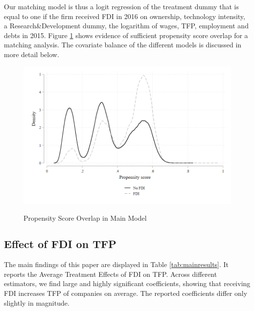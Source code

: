 \documentclass[a4paper,11pt]{scrartcl}
\begin{document}
Our matching model is thus a logit regression of the treatment dummy that is equal to one if the firm received FDI in 2016 on ownership, technology intensity, a Research\&Development dummy, the logarithm of wages, TFP, employment and debts in 2015. Figure \ref{fig:graph} shows evidence of sufficient propensity score overlap for a matching analysis. The covariate balance of the different models is discussed in more detail below.

\begin{figure}[h]\centering
	\caption{Propensity Score Overlap in Main Model}
	\includegraphics[width=\textwidth]{graph}
  	\label{fig:graph}
\end{figure} 


\subsection{Effect of FDI on TFP}
The main findings of this paper are displayed in Table \ref{tab:mainresults}. It reports the Average Treatment Effects of FDI on TFP. Across different estimators, we find large and highly significant coefficients, showing that receiving FDI increases TFP of companies on average. The reported coefficients differ only slightly in magnitude. 
\end{document}
